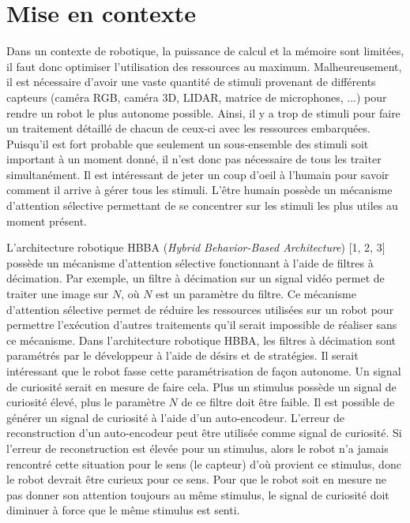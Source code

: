 \section{Mise en contexte}
    Dans un contexte de robotique, la puissance de calcul et la mémoire sont limitées, il faut donc optimiser l'utilisation des ressources au maximum. Malheureusement, il est nécessaire d’avoir une vaste quantité de stimuli provenant de différents capteurs (caméra RGB, caméra 3D, LIDAR, matrice de microphones, ...) pour rendre un robot le plus autonome possible. Ainsi, il y a trop de stimuli pour faire un traitement détaillé de chacun de ceux-ci avec les ressources embarquées. Puisqu’il est fort probable que seulement un sous-ensemble des stimuli soit important à un moment donné, il n’est donc pas nécessaire de tous les traiter simultanément. Il est intéressant de jeter un coup d'oeil à l'humain pour savoir comment il arrive à gérer tous les stimuli. L’être humain possède un mécanisme d’attention sélective permettant de se concentrer sur les stimuli les plus utiles au moment présent.
    \bigskip
    
    L’architecture robotique HBBA (\textit{Hybrid Behavior-Based Architecture})  [1, 2, 3] possède un mécanisme d’attention sélective fonctionnant à l’aide de filtres à décimation. Par exemple, un filtre à décimation sur un signal vidéo permet de traiter une image sur \(N\), où \(N\) est un paramètre du filtre. Ce mécanisme d’attention sélective permet de réduire les ressources utilisées sur un robot pour permettre l’exécution d’autres traitements qu’il serait impossible de réaliser sans ce mécanisme. Dans l’architecture robotique HBBA, les filtres à décimation sont paramétrés par le développeur à l'aide de désirs et de stratégies. Il serait intéressant que le robot fasse cette paramétrisation de façon autonome. Un signal de curiosité serait en mesure de faire cela. Plus un stimulus possède un signal de curiosité élevé, plus le paramètre \(N\) de ce filtre doit être faible. Il est possible de  générer un signal de curiosité à l’aide d’un auto-encodeur. L’erreur de reconstruction d’un auto-encodeur peut être utilisée comme signal de curiosité. Si l'erreur de reconstruction est élevée pour un stimulus, alors le robot n'a jamais rencontré cette situation pour le sens (le capteur) d’où provient ce stimulus, donc le robot devrait être curieux pour ce sens. Pour que le robot soit en mesure ne pas donner son attention toujours au même stimulus, le signal de curiosité doit diminuer à force que le même stimulus est senti.
    \bigskip
    
